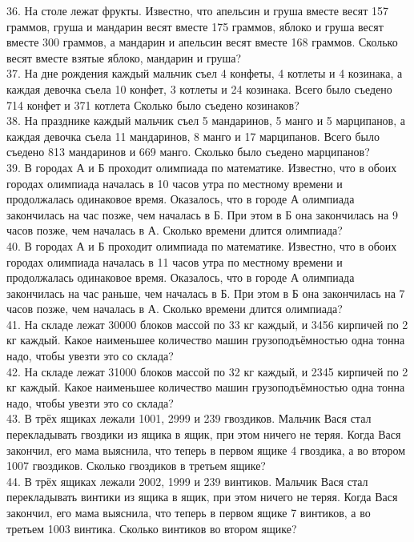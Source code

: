 36. На столе лежат фрукты. Известно, что апельсин и груша вместе весят 157 граммов, груша и мандарин весят вместе 175 граммов, яблоко и груша весят вместе 300 граммов, а мандарин и апельсин весят вместе 168 граммов. Сколько весят вместе взятые яблоко, мандарин и груша?\\
37. На дне рождения каждый мальчик съел 4 конфеты, 4 котлеты и 4 козинака, а каждая девочка съела 10 конфет, 3 котлеты и 24 козинака. Всего было съедено 714 конфет и 371 котлета Сколько было съедено козинаков?\\
38. На празднике каждый мальчик съел 5 мандаринов, 5 манго и 5 марципанов, а каждая девочка съела 11 мандаринов, 8 манго и 17 марципанов. Всего было съедено 813 мандаринов и 669 манго. Сколько было съедено марципанов?\\
39. В городах А и Б проходит олимпиада по математике. Известно, что в обоих городах олимпиада началась в 10 часов утра по местному времени и продолжалась одинаковое время. Оказалось, что в городе А олимпиада закончилась на час позже, чем началась в Б. При этом в Б она закончилась на 9 часов позже, чем началась в А. Сколько времени длится олимпиада?\\
40. В городах А и Б проходит олимпиада по математике. Известно, что в обоих городах олимпиада началась в 11 часов утра по местному времени и продолжалась одинаковое время. Оказалось, что в городе А олимпиада закончилась на час раньше, чем началась в Б. При этом в Б она закончилась на 7 часов позже, чем началась в А. Сколько времени длится олимпиада?\\
41. На складе лежат 30000 блоков массой по 33 кг каждый, и 3456 кирпичей по 2 кг каждый. Какое наименьшее количество машин грузоподъёмностью одна тонна надо, чтобы увезти это со склада?\\
42. На складе лежат 31000 блоков массой по 32 кг каждый, и 2345 кирпичей по 2 кг каждый. Какое наименьшее количество машин грузоподъёмностью одна тонна надо, чтобы увезти это со склада?\\
43. В трёх ящиках лежали 1001, 2999 и 239 гвоздиков. Мальчик Вася стал перекладывать гвоздики из ящика в ящик, при этом ничего не теряя. Когда Вася закончил, его мама выяснила, что теперь в первом ящике 4 гвоздика, а во втором 1007 гвоздиков. Сколько гвоздиков в третьем ящике?\\
44. В трёх ящиках лежали 2002, 1999 и 239 винтиков. Мальчик Вася стал перекладывать винтики из ящика в ящик, при этом ничего не теряя. Когда Вася закончил, его мама выяснила, что теперь в первом ящике 7 винтиков, а во третьем 1003 винтика. Сколько винтиков во втором ящике?\\

